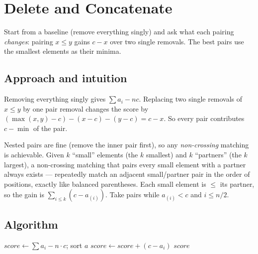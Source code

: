 \section{Delete and Concatenate}
\label{sec:g-delete-concat}


\begin{patternbox}
Start from a baseline (remove everything singly) and ask what each pairing
\emph{changes}: pairing $x\le y$ gains $c-x$ over two single removals.
The best pairs use the smallest elements as their minima.
\end{patternbox}

\subsection*{Approach and intuition}

Removing everything singly gives $\sum a_i-nc$. Replacing two single removals
of $x\le y$ by one pair removal changes the score by
$(\max(x,y)-c)-(x-c)-(y-c)=c-x$. So every pair contributes $c-\min$ of the
pair.

\begin{ideabox}
Nested pairs are fine (remove the inner pair first), so any \emph{non-crossing}
matching is achievable. Given $k$ ``small'' elements (the $k$ smallest) and
$k$ ``partners'' (the $k$ largest), a non-crossing matching that pairs every
small element with a partner always exists --- repeatedly match an adjacent
small/partner pair in the order of positions, exactly like balanced
parentheses. Each small element is $\le$ its partner, so the gain is
$\sum_{i\le k}(c-a_{(i)})$. Take pairs while $a_{(i)}<c$ and $i\le n/2$.
\end{ideabox}

\subsection*{Algorithm}
\begin{algorithmic}[1]
\State $score\gets\sum a_i-n\cdot c$; sort $a$
  \State $score\gets score+(c-a_i)$
\EndFor
\State \Return $score$
\end{algorithmic}

